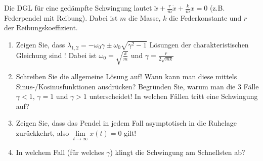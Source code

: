\item Die DGL für eine gedämpfte Schwingung lautet $\ddot{x} + \frac{r}{m} \dot{x} + \frac{k}{m} x = 0$ (z.B. Federpendel mit Reibung). Dabei ist $m$ die Masse, $k$ die Federkonstante und $r$ der Reibungskoeffizient.
\begin{enumerate}
	\item Zeigen Sie, dass $\lambda_{1,2} = -\omega_0 \gamma \pm \omega_0 \sqrt{\gamma^2-1}$ Lösungen der charakteristischen Gleichung sind ! Dabei ist $\omega_0 = \sqrt{\frac{k}{m}}$ und $\gamma = \frac{r}{2\sqrt{mk}}$
	\item Schreiben Sie die allgemeine Lösung auf! Wann kann man diese mittels Sinus-/Kosinusfunktionen ausdrücken? Begründen Sie, warum man die 3 Fälle $\gamma < 1$, $\gamma = 1$ und $\gamma > 1$ unterscheidet! In welchen Fällen tritt eine Schwingung auf?
	\item Zeigen Sie, dass das Pendel in jedem Fall asymptotisch in die Ruhelage zurückkehrt, also $\lim\limits_{t\to\infty} x(t) = 0$ gilt!
	\item In welchem Fall (für welches $\gamma$) klingt die Schwingung am Schnellsten ab?
\end{enumerate}